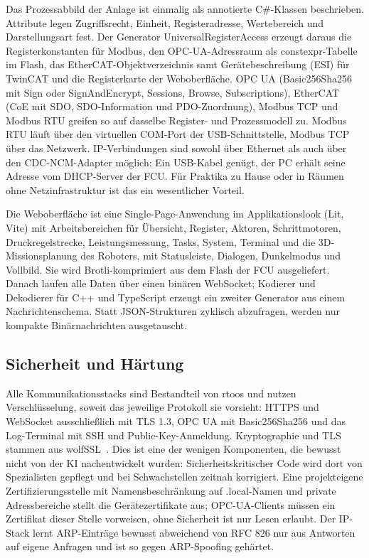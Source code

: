 \documentclass[]{article}
\begin{document}
Das Prozessabbild der Anlage ist einmalig als annotierte C\#-Klassen beschrieben. Attribute legen Zugriffsrecht, Einheit, Registeradresse, Wertebereich und Darstellungsart fest. Der Generator UniversalRegisterAccess erzeugt daraus die Registerkonstanten für Modbus, den OPC-UA-Adressraum als constexpr-Tabelle im Flash, das EtherCAT-Objektverzeichnis samt Gerätebeschreibung (ESI) für TwinCAT und die Registerkarte der Weboberfläche. OPC UA (Basic256Sha256 mit Sign oder SignAndEncrypt, Sessions, Browse, Subscriptions), EtherCAT (CoE mit SDO, SDO-Information und PDO-Zuordnung), Modbus TCP und Modbus RTU greifen so auf dasselbe Register- und Prozessmodell zu. Modbus RTU läuft über den virtuellen COM-Port der USB-Schnittstelle, Modbus TCP über das Netzwerk. IP-Verbindungen sind sowohl über Ethernet als auch über den CDC-NCM-Adapter möglich: Ein USB-Kabel genügt, der PC erhält seine Adresse vom DHCP-Server der FCU. Für Praktika zu Hause oder in Räumen ohne Netzinfrastruktur ist das ein wesentlicher Vorteil.

Die Weboberfläche ist eine Single-Page-Anwendung im Applikationslook (Lit, Vite) mit Arbeitsbereichen für Übersicht, Register, Aktoren, Schrittmotoren, Druckregelstrecke, Leistungsmessung, Tasks, System, Terminal und die 3D-Missionsplanung des Roboters, mit Statusleiste, Dialogen, Dunkelmodus und Vollbild. Sie wird Brotli-komprimiert aus dem Flash der FCU ausgeliefert. Danach laufen alle Daten über einen binären WebSocket; Kodierer und Dekodierer für C++ und TypeScript erzeugt ein zweiter Generator aus einem Nachrichtenschema. Statt JSON-Strukturen zyklisch abzufragen, werden nur kompakte Binärnachrichten ausgetauscht.

\subsection{Sicherheit und Härtung}

Alle Kommunikationsstacks sind Bestandteil von rtoos und nutzen Verschlüsselung, soweit das jeweilige Protokoll sie vorsieht: HTTPS und WebSocket ausschließlich mit TLS 1.3, OPC UA mit Basic256Sha256 und das Log-Terminal mit SSH und Public-Key-Anmeldung. Kryptographie und TLS stammen aus wolfSSL~\cite{wolfssl}. Dies ist eine der wenigen Komponenten, die bewusst nicht von der KI nachentwickelt wurden: Sicherheitskritischer Code wird dort von Spezialisten gepflegt und bei Schwachstellen zeitnah korrigiert. Eine projekteigene Zertifizierungsstelle mit Namensbeschränkung auf .local-Namen und private Adressbereiche stellt die Gerätezertifikate aus; OPC-UA-Clients müssen ein Zertifikat dieser Stelle vorweisen, ohne Sicherheit ist nur Lesen erlaubt. Der IP-Stack lernt ARP-Einträge bewusst abweichend von RFC 826 nur aus Antworten auf eigene Anfragen und ist so gegen ARP-Spoofing gehärtet.
\end{document}
